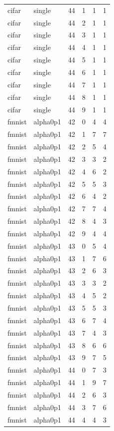 \begin{tabular}{llrrrr}
cifar & single & 44 & 1 & 1 & 1 \\
cifar & single & 44 & 2 & 1 & 1 \\
cifar & single & 44 & 3 & 1 & 1 \\
cifar & single & 44 & 4 & 1 & 1 \\
cifar & single & 44 & 5 & 1 & 1 \\
cifar & single & 44 & 6 & 1 & 1 \\
cifar & single & 44 & 7 & 1 & 1 \\
cifar & single & 44 & 8 & 1 & 1 \\
cifar & single & 44 & 9 & 1 & 1 \\
fmnist & alpha0p1 & 42 & 0 & 4 & 4 \\
fmnist & alpha0p1 & 42 & 1 & 7 & 7 \\
fmnist & alpha0p1 & 42 & 2 & 5 & 4 \\
fmnist & alpha0p1 & 42 & 3 & 3 & 2 \\
fmnist & alpha0p1 & 42 & 4 & 6 & 2 \\
fmnist & alpha0p1 & 42 & 5 & 5 & 3 \\
fmnist & alpha0p1 & 42 & 6 & 4 & 2 \\
fmnist & alpha0p1 & 42 & 7 & 7 & 4 \\
fmnist & alpha0p1 & 42 & 8 & 4 & 3 \\
fmnist & alpha0p1 & 42 & 9 & 4 & 4 \\
fmnist & alpha0p1 & 43 & 0 & 5 & 4 \\
fmnist & alpha0p1 & 43 & 1 & 7 & 6 \\
fmnist & alpha0p1 & 43 & 2 & 6 & 3 \\
fmnist & alpha0p1 & 43 & 3 & 3 & 2 \\
fmnist & alpha0p1 & 43 & 4 & 5 & 2 \\
fmnist & alpha0p1 & 43 & 5 & 5 & 3 \\
fmnist & alpha0p1 & 43 & 6 & 7 & 4 \\
fmnist & alpha0p1 & 43 & 7 & 4 & 3 \\
fmnist & alpha0p1 & 43 & 8 & 6 & 6 \\
fmnist & alpha0p1 & 43 & 9 & 7 & 5 \\
fmnist & alpha0p1 & 44 & 0 & 7 & 3 \\
fmnist & alpha0p1 & 44 & 1 & 9 & 7 \\
fmnist & alpha0p1 & 44 & 2 & 6 & 3 \\
fmnist & alpha0p1 & 44 & 3 & 7 & 6 \\
fmnist & alpha0p1 & 44 & 4 & 4 & 3 \\

\end{tabular}
